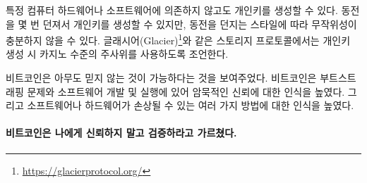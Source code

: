 \begin{comment}
	Note that you can generate a private key without relying on any computational
	hardware or software. You can flip a coin~\cite{antonopoulos2014mastering} a
	couple of times, although depending on your coin and tossing style this source
	of randomness might not be sufficiently random. There is a reason why storage
	protocols like Glacier\footnote{\url{https://glacierprotocol.org/}} advise to
	use casino-grade dice as one of two sources of entropy.
\end{comment}
특정 컴퓨터 하드웨어나 소프트웨어에 의존하지 않고도 개인키를 생성할 수 있다.
동전을 몇 번 던져서 개인키를 생성할 수 있지만\cite{antonopoulos2014mastering},
동전을 던지는 스타일에 따라 무작위성이 충분하지 않을 수 있다.
글래시어(Glacier)\footnote{\url{https://glacierprotocol.org/}}와 같은 스토리지 프로토콜에서는 
개인키 생성 시 카지노 수준의 주사위를 사용하도록 조언한다.

\begin{comment}
	Bitcoin forced me to reflect on what trusting nobody actually entails.
	It raised my awareness of the bootstrapping problem, and the implicit
	chain-of-trust in developing and running software. It also raised my
	awareness of the many ways in which software and hardware can be
	compromised고고
\end{comment}
비트코인은 아무도 믿지 않는 것이 가능하다는 것을 보여주었다.
비트코인은 부트스트래핑 문제와 소프트웨어 개발 및 실행에 있어 암묵적인 신뢰에 대한 인식을 높였다.
그리고 소프트웨어나 하드웨어가 손상될 수 있는 여러 가지 방법에 대한 인식을 높였다.

\paragraph{비트코인은 나에게 신뢰하지 말고 검증하라고 가르쳤다.}

